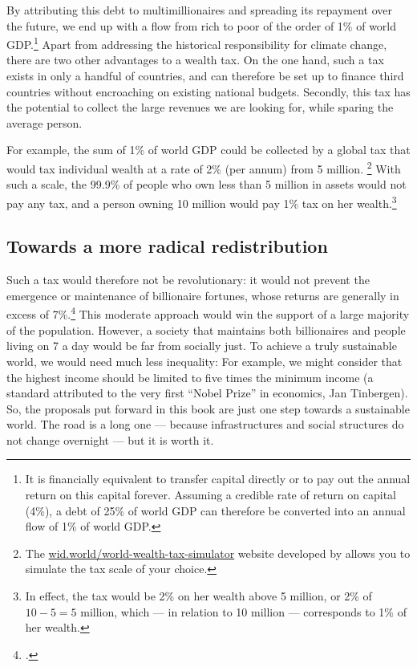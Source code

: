 \documentclass[a5paper,english,openany]{memoir}
\begin{document}
By attributing this debt to multimillionaires and spreading its repayment over the future, we end up with a flow from rich to poor of the order of 1\% of world GDP.\footnote{It is financially equivalent to transfer capital directly or to pay out the annual return on this capital forever. Assuming a credible rate of return on capital (4\%), a debt of 25\% of world GDP can therefore be converted into an annual flow of 1\% of world GDP.} 
Apart from addressing the historical responsibility for climate change, there are two other advantages to a wealth tax. On the one hand, such a tax exists in only a handful of countries, and can therefore be set up to finance third countries without encroaching on existing national budgets. Secondly, this tax has the potential to collect the large revenues we are looking for, while sparing the average person. %

For example, the sum of 1\% of world GDP could be collected by a global tax that would tax individual wealth at a rate of 2\% (per annum) from 5 million.%
\footnote{
The \href{https://wid.world/world-wealth-tax-simulator/}{wid.world/world-wealth-tax-simulator} website developed by \cite{chancel_world_2022} allows you to simulate the tax scale of your choice.} %
With such a scale, the 99.9\% of people who own less than 5 million in assets would not pay any tax, and a person owning 10 million would pay 1\% tax on her wealth.\footnote{In effect, the tax would be 2\% on her wealth above 5 million, or 2\% of $10-5=5$ million, which --- in relation to 10 million --- corresponds to 1\% of her wealth.} 



\subsection{Towards a more radical redistribution}
Such a tax would therefore not be revolutionary: it would not prevent the emergence or maintenance of billionaire fortunes, whose returns are generally in excess of 7\%.\footnote{\cite{chancel_world_2022}.}  
This moderate approach would win the support of a large majority of the population. However, a society that maintains both billionaires and people living on \textit{\texteuro{}}7 a day would be far from socially just. To achieve a truly sustainable world, we would need much less inequality: %
For example, we might consider that the highest income should be limited to five times the minimum income (a standard attributed to the very first ``Nobel Prize'' in economics, Jan Tinbergen). So, the proposals put forward in this book are just one step towards a sustainable world. The road is a long one --- because infrastructures and social structures do not change overnight --- but it is worth it.  
\end{document}
